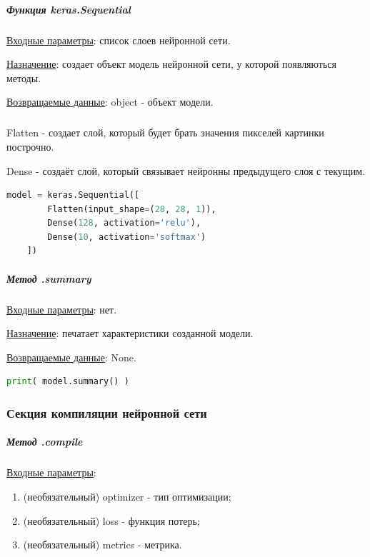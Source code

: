 \subparagraph{Функция keras.Sequential} \hspace{0pt}

\underline{Входные параметры}: список слоев нейронной сети.

\underline{Назначение}: создает объект модель нейронной сети, у которой появляються методы.

\underline{Возвращаемые данные}: object - объект модели.

\subparagraph{} \hspace{0pt}

Flatten - создает слой, который будет брать значения пикселей картинки построчно.

Dense - создаёт слой, который связывает нейронны предыдущего слоя с текущим.

\begin{lstlisting}[language=Python,]
    model = keras.Sequential([
        Flatten(input_shape=(28, 28, 1)),
        Dense(128, activation='relu'),
        Dense(10, activation='softmax')
    ])
\end{lstlisting}

\subparagraph{Метод .summary} \hspace{0pt}

\underline{Входные параметры}: нет.

\underline{Назначение}: печатает характеристики созданной модели.

\underline{Возвращаемые данные}: None.


\begin{lstlisting}[language=Python,]
    print( model.summary() )
\end{lstlisting}



\subsubsection{Секция компиляции нейронной сети}

\subparagraph{Метод .compile} \hspace{0pt}

\underline{Входные параметры}:
\begin{enumerate}
    \item (необязательный) optimizer - тип оптимизации;
    \item (необязательный) loss - функция потерь;
    \item (необязательный) metrics - метрика.
\end{enumerate}

